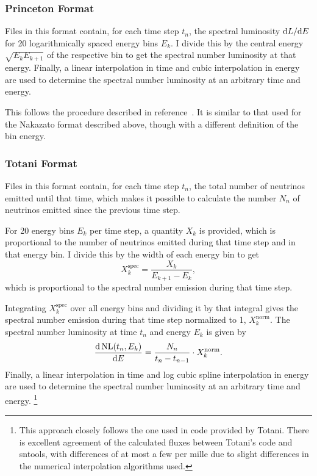 \documentclass[11pt, oneside]{article}
\renewcommand{\d}{\mathrm{d}}
\newcommand{\tdiff}[3][\empty]{\ifx\empty#1
		\frac{\d\,#2}{\d #3}
	\else
		\frac{\d^{#1}\,#2}{\d #3^{#1}}
	\fi} %
\newcommand{\tdiffx}[3][\empty]{\ifx\empty#1
		\d #2 / \d #3
	\else
		\d^{#1} #2 / \d #3^{#1}
	\fi} %
\begin{document}
\subsubsection{Princeton Format}
Files in this format contain, for each time step $t_n$, the spectral luminosity $\tdiffx{L}{E}$ for 20 logarithmically spaced energy bins $E_k$.
I divide this by the central energy $\sqrt{E_k E_{k+1}}$ of the respective bin to get the spectral number luminosity at that energy.
Finally, a linear interpolation in time and cubic interpolation in energy are used to determine the spectral number luminosity at an arbitrary time and energy.

This follows the procedure described in reference~\cite{Seadrow2018}.
It is similar to that used for the Nakazato format described above, though with a different definition of the bin energy.

\subsubsection{Totani Format}
Files in this format contain, for each time step $t_n$, the total number of neutrinos emitted until that time, which makes it possible to calculate the number $N_n$ of neutrinos emitted since the previous time step.

For 20 energy bins $E_k$ per time step, a quantity $X_k$ is provided, which is proportional to the number of neutrinos emitted during that time step and in that energy bin.
I divide this by the width of each energy bin to get
\begin{equation}
X_k^\text{spec} = \frac{X_k}{E_{k+1} - E_k},
\end{equation}
which is proportional to the spectral number emission during that time step.

Integrating $X_k^\text{spec}$ over all energy bins and dividing it by that integral gives the spectral number emission during that time step normalized to 1, $X_k^\text{norm}$.
The spectral number luminosity at time $t_n$ and energy $E_k$ is given by
\begin{equation}
\tdiff{\text{NL} (t_n, E_k)}{E} = \frac{N_n}{t_n - t_{n-1}} \cdot X_k^\text{norm}.
\end{equation}
Finally, a linear interpolation in time and log cubic spline interpolation in energy are used to determine the spectral number luminosity at an arbitrary time and energy.%
\footnote{This approach closely follows the one used in code provided by Totani. There is excellent agreement of the calculated fluxes between Totani’s code and sntools, with differences of at most a few per mille due to slight differences in the numerical interpolation algorithms used.}
\end{document}

